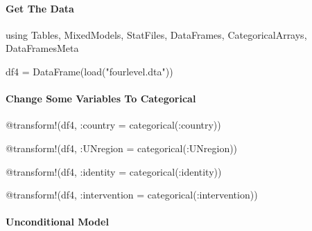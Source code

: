 \documentclass[
  letterpaper,
  DIV=11,
  numbers=noendperiod]{scrreprt}
\let\oldparagraph\paragraph
\renewcommand{\paragraph}[1]{\oldparagraph{#1}\mbox{}}
\newenvironment{Shaded}{\begin{snugshade}}{\end{snugshade}}
\newcommand{\BuiltInTok}[1]{\textcolor[rgb]{0.00,0.23,0.31}{#1}}
\newcommand{\FunctionTok}[1]{\textcolor[rgb]{0.28,0.35,0.67}{#1}}
\newcommand{\ImportTok}[1]{\textcolor[rgb]{0.00,0.46,0.62}{#1}}
\newcommand{\NormalTok}[1]{\textcolor[rgb]{0.00,0.23,0.31}{#1}}
\newcommand{\OperatorTok}[1]{\textcolor[rgb]{0.37,0.37,0.37}{#1}}
\newcommand{\PreprocessorTok}[1]{\textcolor[rgb]{0.68,0.00,0.00}{#1}}
\newcommand{\StringTok}[1]{\textcolor[rgb]{0.13,0.47,0.30}{#1}}
\begin{document}
\paragraph{Get The Data}\label{get-the-data-10}

\begin{Shaded}
\begin{Highlighting}[]
\ImportTok{using} \BuiltInTok{Tables}\NormalTok{, }\BuiltInTok{MixedModels}\NormalTok{, }\BuiltInTok{StatFiles}\NormalTok{, }\BuiltInTok{DataFrames}\NormalTok{, }\BuiltInTok{CategoricalArrays}\NormalTok{, }\BuiltInTok{DataFramesMeta}

\NormalTok{df4 }\OperatorTok{=} \FunctionTok{DataFrame}\NormalTok{(}\FunctionTok{load}\NormalTok{(}\StringTok{"fourlevel.dta"}\NormalTok{))}
\end{Highlighting}
\end{Shaded}

\paragraph{Change Some Variables To
Categorical}\label{change-some-variables-to-categorical-6}

\begin{Shaded}
\begin{Highlighting}[]
\PreprocessorTok{@transform}\NormalTok{!(df4, }\OperatorTok{:}\NormalTok{country }\OperatorTok{=} \FunctionTok{categorical}\NormalTok{(}\OperatorTok{:}\NormalTok{country))}

\PreprocessorTok{@transform}\NormalTok{!(df4, }\OperatorTok{:}\NormalTok{UNregion }\OperatorTok{=} \FunctionTok{categorical}\NormalTok{(}\OperatorTok{:}\NormalTok{UNregion))}

\PreprocessorTok{@transform}\NormalTok{!(df4, }\OperatorTok{:}\NormalTok{identity }\OperatorTok{=} \FunctionTok{categorical}\NormalTok{(}\OperatorTok{:}\NormalTok{identity))}

\PreprocessorTok{@transform}\NormalTok{!(df4, }\OperatorTok{:}\NormalTok{intervention }\OperatorTok{=} \FunctionTok{categorical}\NormalTok{(}\OperatorTok{:}\NormalTok{intervention))}
\end{Highlighting}
\end{Shaded}

\paragraph{Unconditional Model}\label{unconditional-model-2}
\end{document}
